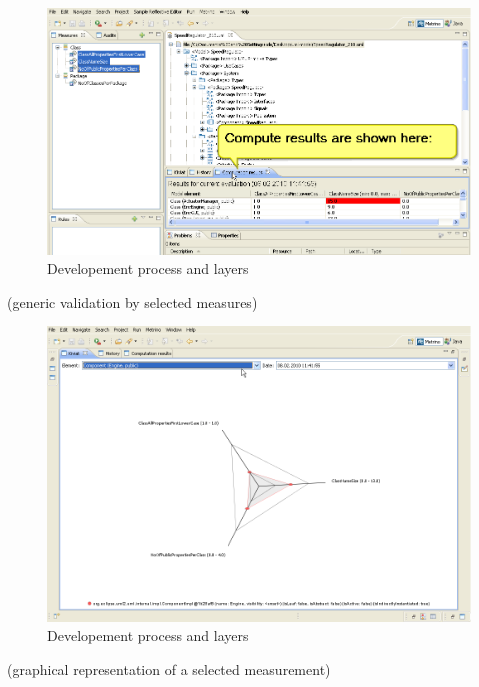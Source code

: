 \begin{figure}
	\centering
		\includegraphics[width=\textwidth]{metrino_screen_1}
	\caption{Developement process and layers}
	\label{fig:sonarrunning}
\end{figure}

(generic validation by selected measures)

\begin{figure}
	\centering
		\includegraphics[width=\textwidth]{metrino_screen_2}
	\caption{Developement process and layers}
	\label{fig:sonarrunning}
\end{figure}

(graphical representation of a selected measurement)

